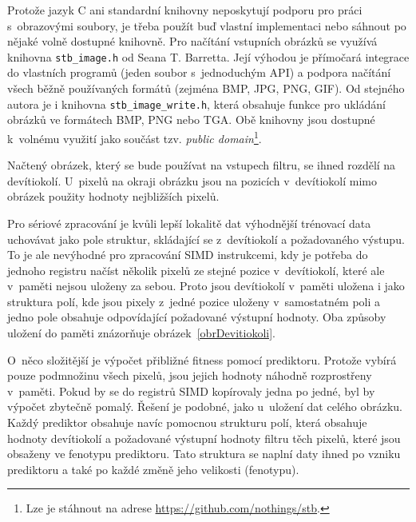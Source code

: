 Protože jazyk C ani standardní knihovny neposkytují podporu pro práci s~obrazovými soubory, je třeba použít buď vlastní implementaci nebo sáhnout po nějaké volně dostupné knihovně. Pro načítání vstupních obrázků se využívá knihovna \texttt{stb\_image.h} od Seana T. Barretta. Její výhodou je přímočará integrace do vlastních programů (jeden soubor s~jednoduchým API) a podpora načítání všech běžně používaných formátů (zejména BMP, JPG, PNG, GIF). Od stejného autora je i knihovna \texttt{stb\_image\_write.h}, která obsahuje funkce pro ukládání obrázků ve formátech BMP, PNG nebo TGA. Obě knihovny jsou dostupné k~volnému využití jako součást tzv. \emph{public domain}\footnote{Lze je stáhnout na adrese \url{https://github.com/nothings/stb}.}.

Načtený obrázek, který se bude používat na vstupech filtru, se ihned rozdělí na devítiokolí. U~pixelů na okraji obrázku jsou na pozicích v~devítiokolí mimo obrázek použity hodnoty nejbližších pixelů.

Pro sériové zpracování je kvůli lepší lokalitě dat výhodnější trénovací data uchovávat jako pole struktur, skládající se z~devítiokolí a požadovaného výstupu. To je ale nevýhodné pro zpracování SIMD instrukcemi, kdy je potřeba do jednoho registru načíst několik pixelů ze stejné pozice v~devítiokolí, které ale v~paměti nejsou uloženy za sebou. Proto jsou devítiokolí v~paměti uložena i jako struktura polí, kde jsou pixely z~jedné pozice uloženy v~samostatném poli a jedno pole obsahuje odpovídající požadované výstupní hodnoty. Oba způsoby uložení do paměti znázorňuje obrázek~\ref{obrDevitiokoli}.

O~něco složitější je výpočet přibližné fitness pomocí prediktoru. Protože vybírá pouze podmnožinu všech pixelů, jsou jejich hodnoty náhodně rozprostřeny v~paměti. Pokud by se do registrů SIMD kopírovaly jedna po jedné, byl by výpočet zbytečně pomalý. Řešení je podobné, jako u~uložení dat celého obrázku. Každý prediktor obsahuje navíc pomocnou strukturu polí, která obsahuje hodnoty devítiokolí a požadované výstupní hodnoty filtru těch pixelů, které jsou obsaženy ve fenotypu prediktoru. Tato struktura se naplní daty ihned po vzniku prediktoru a také po každé změně jeho velikosti (fenotypu).

